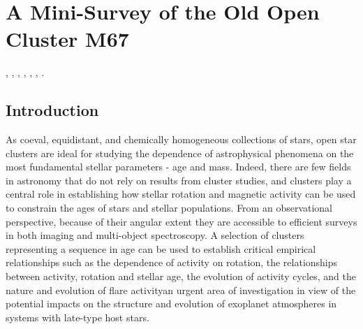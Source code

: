 %
%
%

\section{A Mini-Survey of the Old Open Cluster M67}
\def\secname{M67_special}\label{sec:\secname}

,
,
,
,
,
,
.


\subsection{Introduction}

As coeval, equidistant, and chemically homogeneous collections of stars, open
star clusters are ideal for studying the dependence of astrophysical phenomena
on the most fundamental stellar parameters - age and mass.
Indeed, there are few fields in astronomy that do not rely on results from
cluster studies, and clusters play a central role in establishing how stellar
rotation and magnetic activity can be used to constrain the ages of stars and
stellar populations.
From an observational perspective, because of their angular extent they are
accessible to efficient surveys in both imaging and multi-object spectroscopy.
A selection of clusters representing a sequence in age can be used to
establish critical empirical relationships such as the dependence of activity
on rotation, the relationships between activity, rotation and stellar age, the
evolution of activity cycles, and the nature and evolution of flare
activity\textemdash{}an urgent area of investigation in view of the potential
impacts on the structure and evolution of exoplanet atmospheres in systems
with late-type host stars.

